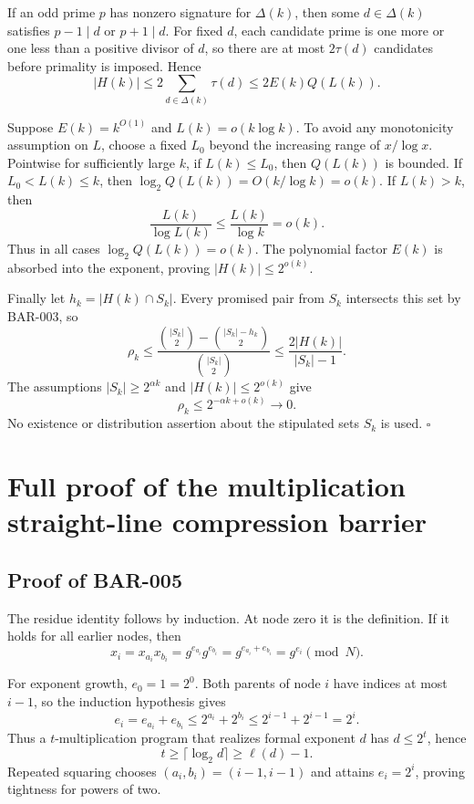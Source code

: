\documentclass[11pt]{article}
\begin{document}
If an odd prime \(p\) has nonzero signature for \(\Delta(k)\), then some
\(d\in\Delta(k)\) satisfies \(p-1\mid d\) or \(p+1\mid d\). For fixed \(d\),
each candidate prime is one more or one less than a positive divisor of
\(d\), so there are at most \(2\tau(d)\) candidates before primality is
imposed. Hence
\[
|H(k)|
\le2\sum_{d\in\Delta(k)}\tau(d)
\le2E(k)Q(L(k)).
\]

Suppose \(E(k)=k^{O(1)}\) and \(L(k)=o(k\log k)\). To avoid any monotonicity
assumption on \(L\), choose a fixed \(L_0\) beyond the increasing range of
\(x/\log x\). Pointwise for sufficiently large \(k\), if
\(L(k)\le L_0\), then \(Q(L(k))\) is bounded. If
\(L_0<L(k)\le k\), then
\(\log_2Q(L(k))=O(k/\log k)=o(k)\). If \(L(k)>k\), then
\[
\frac{L(k)}{\log L(k)}
\le\frac{L(k)}{\log k}
=o(k).
\]
Thus in all cases \(\log_2Q(L(k))=o(k)\). The polynomial factor \(E(k)\)
is absorbed into the exponent, proving \(|H(k)|\le2^{o(k)}\).

Finally let \(h_k=|H(k)\cap S_k|\). Every promised pair from \(S_k\)
intersects this set by BAR-003, so
\[
\rho_k
\le
\frac{\binom{|S_k|}{2}-\binom{|S_k|-h_k}{2}}
     {\binom{|S_k|}{2}}
\le
\frac{2|H(k)|}{|S_k|-1}.
\]
The assumptions \(|S_k|\ge2^{\alpha k}\) and
\(|H(k)|\le2^{o(k)}\) give
\[
\rho_k\le2^{-\alpha k+o(k)}\longrightarrow0.
\]
No existence or distribution assertion about the stipulated sets \(S_k\)
is used. \(\square\)

\section{Full proof of the multiplication straight-line compression barrier}

\subsection{Proof of BAR-005}\label{proof:BAR-005}

The residue identity follows by induction. At node zero it is the definition.
If it holds for all earlier nodes, then
\[
x_i
=x_{a_i}x_{b_i}
=g^{e_{a_i}}g^{e_{b_i}}
=g^{e_{a_i}+e_{b_i}}
=g^{e_i}\pmod N.
\]

For exponent growth, \(e_0=1=2^0\). Both parents of node \(i\) have indices
at most \(i-1\), so the induction hypothesis gives
\[
e_i=e_{a_i}+e_{b_i}
\le2^{a_i}+2^{b_i}
\le2^{i-1}+2^{i-1}
=2^i.
\]
Thus a \(t\)-multiplication program that realizes formal exponent \(d\) has
\(d\le2^t\), hence
\[
t\ge\lceil\log_2d\rceil\ge\ell(d)-1.
\]
Repeated squaring chooses \((a_i,b_i)=(i-1,i-1)\) and attains
\(e_i=2^i\), proving tightness for powers of two.
\end{document}
